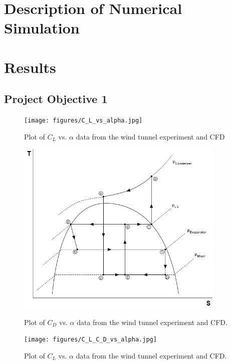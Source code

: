 \documentclass[
	12pt, %
]{refrigeration_report_style}
\begin{document}

\section{Description of Numerical Simulation} 
\lipsum[1]
 
\section{Results}


\subsection{Project Objective 1}

\begin{figure}[H]%
    \centering
    {{\texttt{[image: figures/C\_L\_vs\_alpha.jpg]} }}%
    \caption{Plot of $C_L$ vs. $\alpha$ data from the wind tunnel experiment and CFD}
    \label{fig:C_L_vs_alpha}%
\end{figure}  

\begin{figure}[H]%
    \centering
    {{\includegraphics[width=10cm]{figures/C_D_vs_alpha.jpg} }}%
    \caption{Plot of $C_D$ vs. $\alpha$ data from the wind tunnel experiment and CFD.}
    \label{fig:C_D_vs_alpha}%
\end{figure}  

\begin{figure}[H]%
    \centering
    {{\texttt{[image: figures/C\_L\_C\_D\_vs\_alpha.jpg]} }}%
    \caption{Plot of $C_L$ vs. $\alpha$ data from the wind tunnel experiment and CFD.}
    \label{fig:C_L_C_D_vs_alpha}%
\end{figure}  
\end{document}
